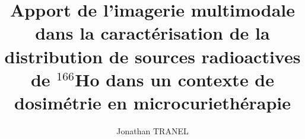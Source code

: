 \documentclass[a4paper]{article}
\title{\textbf{\large Apport de l'imagerie multimodale  dans la caract\'erisation de la distribution de sources radioactives de $^{166}$Ho dans un contexte de dosim\'etrie en microcurieth\'erapie}}
\author{Jonathan TRANEL}
\begin{document}
    \makeflyleaf
\end{document}
